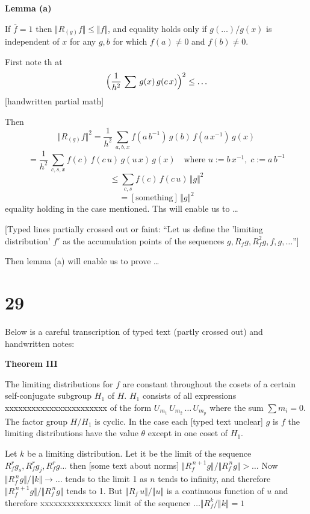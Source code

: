 \documentclass[12pt]{article}
\begin{document}
\textbf{Lemma (a)}

If \(\overline{f} = 1\) then \(\Vert R_{(g)} f\Vert \le \Vert f\Vert\), and equality holds
only if \(g(\ldots)/g(x)\) is independent of \(x\) for any \(g, b\)
for which \(f(a)\neq 0\) and \(f(b)\neq 0\).

First note th at
\[
\Bigl(\frac{1}{h^2}\,\sum\,g(x)\,g(c\,x)\Bigr)^2 \le \ldots
\]
[handwritten partial math]

Then
\[
\Vert R_{(g)} f\Vert^2
  = \frac{1}{h^2}\,\sum_{a,b,x} f(a\,b^{-1})\,g(b)\,f(a\,x^{-1})\,g(x)
\]
\[
= \frac{1}{h^2}\,\sum_{c,s,x} f(c)\,f(c\,u)\,g(u\,x)\,g(x)
  \quad\text{where }u := b\,x^{-1},\; c := a\,b^{-1}
\]
\[
\le \sum_{c,s} f(c)\,f(c\,u)\,\Vert g\Vert^2
\]
\[
= [\text{something}]\,\Vert g\Vert^2
\]
equality holding in the case mentioned. Ths will enable us to \ldots

[Typed lines partially crossed out or faint:
``Let us define the 'limiting distribution' \(f'\) as the
accumulation points of the sequences \(g, R_f g, R_f^2 g, f, g,\ldots\)'']

Then lemma (a) will enable us to prove
\ldots

\section{29}

Below is a careful transcription of typed text (partly crossed out) and handwritten notes:

\bigskip

\textbf{Theorem III}

The limiting distributions for \(f\) are constant throughout
the cosets of a certain self-conjugate subgroup \(H_1\) of \(H\). \(H_1\)
consists of all expressions xxxxxxxxxxxxxxxxxxxxxxx
of the form \(U_{m_1}\,U_{m_2}\,\ldots\,U_{m_p}\) where the sum \(\sum m_i = 0\). The factor
group \(H / H_1\) is cyclic. In the case each [typed text unclear]
\(g\) is \(f\) the limiting distributions have the value \(\theta\) except
in one coset of \(H_1\).

Let \(k\) be a limiting distribution. Let it be the limit of
the sequence \(R_f^r g_s, R_f^r g_j, R_f^r g\ldots\)
then [some text about norms] \(\Vert R_f^{\,n+1} g\Vert / \Vert R_f^{\,n} g\Vert > \ldots\)
Now \(\Vert R_f^{\,n} g\Vert / \Vert k\Vert \to \ldots\)
tends to the limit 1 as \(n\) tends to infinity, and therefore
\(\Vert R_f^{\,n+1} g\Vert / \Vert R_f^{\,n} g\Vert\) tends to 1. But \(\Vert R_f\,u\Vert / \Vert u\Vert\)
is a continuous function of \(u\) and therefore xxxxxxxxxxxxxxxx
limit of the sequence \(\ldots \Vert R_f^k / \Vert k\Vert = 1\)
\end{document}
